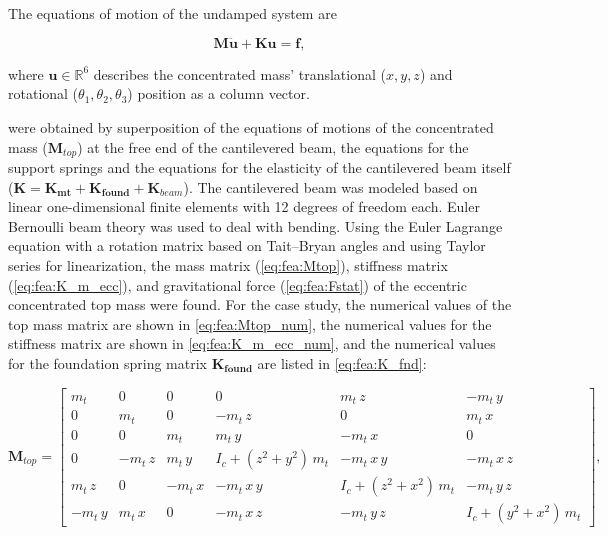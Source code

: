 \documentclass{article}
\begin{document}
The equations of motion of the undamped system are

\begin{equation}
    \mathbf{M\ddot{\mathbf{u}}}+\mathbf{K}\mathbf{u} = \mathbf{f},
    \label{eq:fea:system}
\end{equation}

where $\mathbf{u} \in \mathbb{R}^6$ describes the concentrated mass' translational ($x,y,z$) and rotational ($\theta_1, \theta_2, \theta_3$) position as a column vector.

were obtained by superposition of the equations of motions of the concentrated mass ($\mathbf{M}_{top}$) at the free end of the cantilevered beam, the equations for the support springs and the equations for the elasticity of the cantilevered beam itself ($\mathbf{K} = \mathbf{K_{mt}} + \mathbf{K_{found}}+\mathbf{K}_{beam}$). The cantilevered beam was modeled based on linear one-dimensional finite elements with 12 degrees of freedom each. Euler Bernoulli beam theory was used to deal with bending. Using the Euler Lagrange equation with a rotation matrix based on Tait–Bryan angles and using Taylor series for linearization, the mass matrix (\autoref{eq:fea:Mtop}), stiffness matrix (\autoref{eq:fea:K_m_ecc}), and gravitational force (\autoref{eq:fea:Fstat}) of the eccentric concentrated top mass were found. For the case study, the numerical values of the top mass matrix are shown in \autoref{eq:fea:Mtop_num}, the numerical values for the stiffness matrix are shown in \autoref{eq:fea:K_m_ecc_num}, and the numerical values for the foundation spring matrix $\mathbf{K_{found}}$ are listed in \autoref{eq:fea:K_fnd}:


\begin{small}
    \begin{equation}
       \mathbf{M}_{top}  = 
        \begin{bmatrix}
         m_{t}  & 0             & 0             & 0                                             & m_{t}\,z                                  & -m_{t}\,y           \\ 
         0             & m_{t}  & 0             & -m_{t}\,z                                 & 0                                             & m_{t}\,x            \\ 
         0             & 0              & m_{t}  & m_{t}\,y                                     & -m_{t}\,x                                    & 0                    \\ 
         0             & -m_{t}\,z & m_{t}\,y     & I_{c}+\left({z}^2+{y   }^2\right)\,m_{t} & -m_{t}\,x   \,y                             & -m_{t}\,x   \,z \\ 
         m_{t}\,z  & 0             & -m_{t}\,x    & -m_{t}\,x   \,y                             & I_{c}+\left({z}^2+{x   }^2\right)\,m_{t} & -m_{t}\,y   \,z \\
         -m_{t}\,y    & m_{t}\,x     & 0             & -m_{t}\,x   \,z                          & -m_{t}\,y   \,z                          & I_{c}+\left({y   }^2+{x   }^2\right)\,m_{t} 
        \end{bmatrix},
        \label{eq:fea:Mtop}
    \end{equation}
\end{small}
\end{document}
